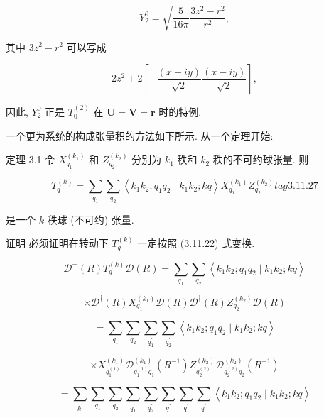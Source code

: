 $$
{Y}_{2}^{0} = \sqrt{\frac{5}{16\pi }}\frac{3{z}^{2} - {r}^{2}}{{r}^{2}},
$$

其中 $3{z}^{2} - {r}^{2}$ 可以写成

$$
2{z}^{2} + 2\left\lbrack {-\frac{\left( x + iy\right) }{\sqrt{2}}\frac{\left( x - iy\right) }{\sqrt{2}}}\right\rbrack ,
$$

因此, ${Y}_{2}^{0}$ 正是 ${T}_{0}^{\left( 2\right) }$ 在 $\mathbf{U} = \mathbf{V} = \mathbf{r}$ 时的特例.

一个更为系统的构成张量积的方法如下所示. 从一个定理开始:

定理 3.1 令 ${X}_{{q}_{1}}^{\left( {k}_{1}\right) }$ 和 ${Z}_{{q}_{2}}^{\left( {k}_{2}\right) }$ 分别为 ${k}_{1}$ 秩和 ${k}_{2}$ 秩的不可约球张量. 则

$$
{T}_{q}^{\left( k\right) } = \mathop{\sum }\limits_{{q}_{1}}\mathop{\sum }\limits_{{q}_{2}}\left\langle {{k}_{1}{k}_{2};{q}_{1}{q}_{2} \mid {k}_{1}{k}_{2};{kq}}\right\rangle {X}_{{q}_{1}}^{\left( {k}_{1}\right) }{Z}_{{q}_{2}}^{\left( {k}_{2}\right) } tag{3.11.27}
$$

是一个 $k$ 秩球 (不可约) 张量.

证明 必须证明在转动下 ${T}_{q}^{\left( k\right) }$ 一定按照 (3.11.22) 式变换.

$$
{\mathcal{D}}^{ + }\left( R\right) {T}_{q}^{\left( k\right) }\mathcal{D}\left( R\right) = \mathop{\sum }\limits_{{q}_{1}}\mathop{\sum }\limits_{{q}_{2}}\left\langle {{k}_{1}{k}_{2};{q}_{1}{q}_{2} \mid {k}_{1}{k}_{2};{kq}}\right\rangle
$$

$$
\times {\mathcal{D}}^{ \dagger }\left( R\right) {X}_{{q}_{1}}^{\left( {k}_{1}\right) }\mathcal{D}\left( R\right) {\mathcal{D}}^{ \dagger }\left( R\right) {Z}_{{q}_{2}}^{\left( {k}_{2}\right) }\mathcal{D}\left( R\right)
$$

$$
= \mathop{\sum }\limits_{{q}_{1}}\mathop{\sum }\limits_{{q}_{2}}\mathop{\sum }\limits_{{q}_{1}^{\prime }}\mathop{\sum }\limits_{{q}_{2}^{\prime }}\left\langle {{k}_{1}{k}_{2};{q}_{1}{q}_{2} \mid {k}_{1}{k}_{2};{kq}}\right\rangle
$$

$$
\times {X}_{{q}_{1}^{\left( 1\right) }}^{\left( {k}_{1}\right) }{\mathcal{D}}_{{q}_{1}^{\left( 1\right) }{q}_{1}}^{\left( {k}_{1}\right) }\left( {R}^{-1}\right) {Z}_{{q}_{2}^{\left( 2\right) }}^{\left( {k}_{2}\right) }{\mathcal{D}}_{{q}_{2}^{\left( 2\right) }{q}_{2}}^{\left( {k}_{2}\right) }\left( {R}^{-1}\right)
$$

$$
= \mathop{\sum }\limits_{{k}^{\prime }}\mathop{\sum }\limits_{{q}_{1}}\mathop{\sum }\limits_{{q}_{2}}\mathop{\sum }\limits_{{q}_{1}^{\prime }}\mathop{\sum }\limits_{{q}_{2}^{\prime }}\mathop{\sum }\limits_{{q}^{\prime }}\mathop{\sum }\limits_{{q}^{\prime }}\mathop{\sum }\limits_{{q}^{\prime }}\left\langle {{k}_{1}{k}_{2};{q}_{1}{q}_{2} \mid {k}_{1}{k}_{2};{kq}}\right\rangle
$$

